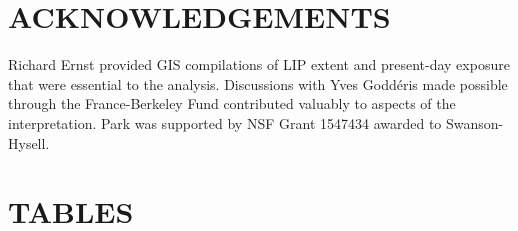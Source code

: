 \documentclass[11pt,letterpaper]{article}
\begin{document}
\section*{ACKNOWLEDGEMENTS \label{sec:ACKNOWLEDGEMENTS}}

Richard Ernst provided GIS compilations of LIP extent and present-day exposure that were essential to the analysis. Discussions with Yves Godd\'eris made possible through the France-Berkeley Fund contributed valuably to aspects of the interpretation. Park was supported by NSF Grant 1547434 awarded to Swanson-Hysell.

\clearpage
\newpage

\section*{TABLES}
\end{document}
